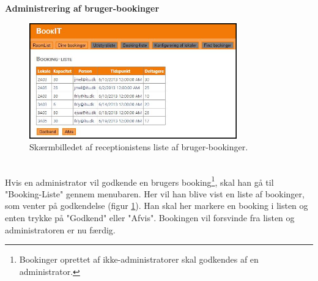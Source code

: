 \textbf{Administrering af bruger-bookinger}
\begin{figure}[h!]
  \centering
    \includegraphics[width=0.8\textwidth]{Appendix/GUI-Prototype/DigitalMockup/BookingListe}
  \caption{Skærmbilledet af receptionistens liste af bruger-bookinger.}
\label{Design_G_Development_BookingListe_Final}
\end{figure} 
\\Hvis en administrator vil godkende en brugers booking\footnote{Bookinger oprettet af ikke-administratorer skal godkendes af en administrator.}, skal han gå til "Booking-Liste" gennem menubaren. Her vil han blive vist en liste af bookinger, som venter på godkendelse (figur \ref{Design_G_Development_BookingListe_Final}). Han skal her markere en booking i listen og enten trykke på "Godkend" eller "Afvis". Bookingen vil forsvinde fra listen og administratoren er nu færdig.

